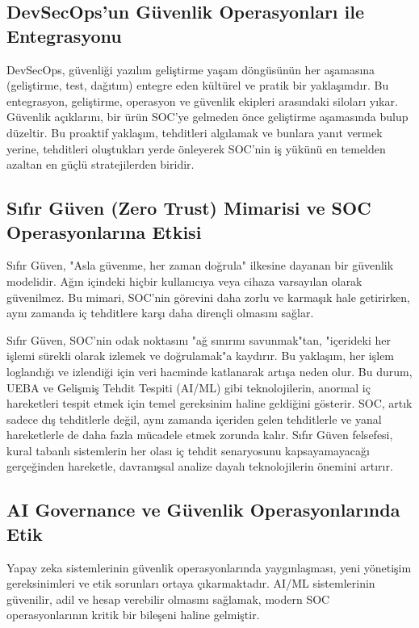 \subsection{DevSecOps'un Güvenlik Operasyonları ile Entegrasyonu}

DevSecOps, güvenliği yazılım geliştirme yaşam döngüsünün her aşamasına (geliştirme, test, dağıtım) entegre eden kültürel ve pratik bir yaklaşımdır. Bu entegrasyon, geliştirme, operasyon ve güvenlik ekipleri arasındaki siloları yıkar. Güvenlik açıklarını, bir ürün SOC'ye gelmeden önce geliştirme aşamasında bulup düzeltir. Bu proaktif yaklaşım, tehditleri algılamak ve bunlara yanıt vermek yerine, tehditleri oluştukları yerde önleyerek SOC'nin iş yükünü en temelden azaltan en güçlü stratejilerden biridir.

\subsection{Sıfır Güven (Zero Trust) Mimarisi ve SOC Operasyonlarına Etkisi}

Sıfır Güven, "Asla güvenme, her zaman doğrula" ilkesine dayanan bir güvenlik modelidir. Ağın içindeki hiçbir kullanıcıya veya cihaza varsayılan olarak güvenilmez. Bu mimari, SOC'nin görevini daha zorlu ve karmaşık hale getirirken, aynı zamanda iç tehditlere karşı daha dirençli olmasını sağlar.

Sıfır Güven, SOC'nin odak noktasını "ağ sınırını savunmak"tan, "içerideki her işlemi sürekli olarak izlemek ve doğrulamak"a kaydırır. Bu yaklaşım, her işlem loglandığı ve izlendiği için veri hacminde katlanarak artışa neden olur. Bu durum, UEBA ve Gelişmiş Tehdit Tespiti (AI/ML) gibi teknolojilerin, anormal iç hareketleri tespit etmek için temel gereksinim haline geldiğini gösterir. SOC, artık sadece dış tehditlerle değil, aynı zamanda içeriden gelen tehditlerle ve yanal hareketlerle de daha fazla mücadele etmek zorunda kalır. Sıfır Güven felsefesi, kural tabanlı sistemlerin her olası iç tehdit senaryosunu kapsayamayacağı gerçeğinden hareketle, davranışsal analize dayalı teknolojilerin önemini artırır.

\subsection{AI Governance ve Güvenlik Operasyonlarında Etik}

Yapay zeka sistemlerinin güvenlik operasyonlarında yaygınlaşması, yeni yönetişim gereksinimleri ve etik sorunları ortaya çıkarmaktadır. AI/ML sistemlerinin güvenilir, adil ve hesap verebilir olmasını sağlamak, modern SOC operasyonlarının kritik bir bileşeni haline gelmiştir.

